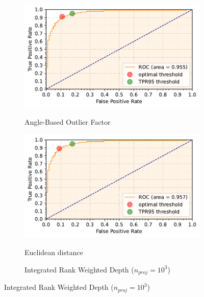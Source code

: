 \begin{figure}[t]
    \centering
    \begin{subfigure}[b]{0.495\textwidth}
        \centering
        \caption{\small Angle-Based Outlier Factor}
        \includegraphics[width=\textwidth]{images/distributions/rocs/roc-distributions-dimension_250-samples_1000-distance_8-distribution_gaussian-model_ABOF-seed_0.pdf}
        \label{fig:roc-abof}
    \end{subfigure}
    \hfill
    \begin{subfigure}[b]{0.495\textwidth}
        \centering
        \caption{\small Euclidean distance}
        \includegraphics[width=\textwidth]{images/distributions/rocs/roc-distributions-dimension_250-samples_1000-distance_8-distribution_gaussian-model_ED-seed_0.pdf}
        \label{fig:roc-euclidean}
    \end{subfigure}
    \begin{subfigure}[b]{0.495\textwidth}
        \centering
        \caption{\footnotesize Integrated Rank Weighted Depth ({\scriptsize$n_{proj} = 10^3$})}

\end{subfigure}
\end{figure}
